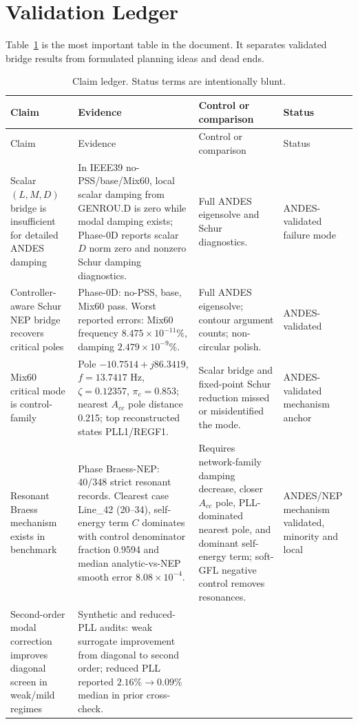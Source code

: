 \documentclass[11pt]{article}
\begin{document}
\section{Validation Ledger}

Table~\ref{tab:ledger} is the most important table in the document. It separates
validated bridge results from formulated planning ideas and dead ends.

\begin{longtable}{p{}p{}p{}p{}}
\caption{Claim ledger. Status terms are intentionally blunt.}\label{tab:ledger}\\
\toprule
Claim & Evidence & Control or comparison & Status\\
\midrule
\endfirsthead
\toprule
Claim & Evidence & Control or comparison & Status\\
\midrule
\endhead
Scalar $(L,M,D)$ bridge is insufficient for detailed ANDES damping
& In IEEE39 no-PSS/base/Mix60, local scalar damping from GENROU.D is zero while modal damping exists; Phase-0D reports scalar $D$ norm zero and nonzero Schur damping diagnostics.
& Full ANDES eigensolve and Schur diagnostics.
& ANDES-validated failure mode\\
\midrule
Controller-aware Schur NEP bridge recovers critical poles
& Phase-0D: no-PSS, base, Mix60 pass. Worst reported errors: Mix60 frequency $8.475\times10^{-11}\%$, damping $2.479\times10^{-9}\%$.
& Full ANDES eigensolve; contour argument counts; non-circular polish.
& ANDES-validated\\
\midrule
Mix60 critical mode is control-family
& Pole $-10.7514+j86.3419$, $f=13.7417$ Hz, $\zeta=0.12357$, $\pi_c=0.853$; nearest $A_{cc}$ pole distance 0.215; top reconstructed states PLL1/REGF1.
& Scalar bridge and fixed-point Schur reduction missed or misidentified the mode.
& ANDES-validated mechanism anchor\\
\midrule
Resonant Braess mechanism exists in benchmark
& Phase Braess-NEP: 40/348 strict resonant records. Clearest case Line\_42 (20--34), self-energy term $C$ dominates with control denominator fraction 0.9594 and median analytic-vs-NEP smooth error $8.08\times10^{-4}$.
& Requires network-family damping decrease, closer $A_{cc}$ pole, PLL-dominated nearest pole, and dominant self-energy term; soft-GFL negative control removes resonances.
& ANDES/NEP mechanism validated, minority and local\\
\midrule
Second-order modal correction improves diagonal screen in weak/mild regimes
& Synthetic and reduced-PLL audits: weak surrogate improvement from diagonal to second order; reduced PLL reported $2.16\%\to0.09\%$ median in prior cross-check.

\end{longtable}
\end{document}
